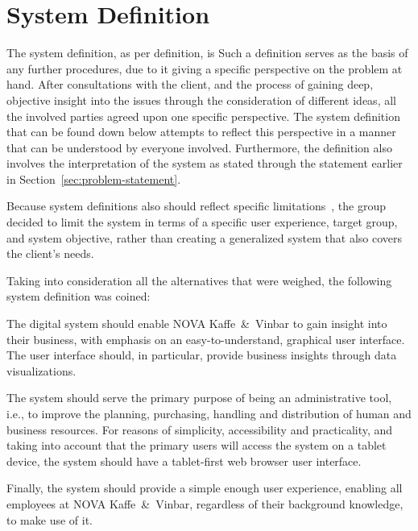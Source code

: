 \section{System Definition}\label{sec:system-definition}

The system definition, as per definition, is
Such a definition serves as the basis of any further procedures, due to it giving a specific perspective on the problem
at hand.
After consultations with the client, and the process of gaining deep, objective insight into the issues through the
consideration of different ideas, all the involved parties agreed upon one specific perspective.
The system definition that can be found down below attempts to reflect this perspective in a manner that can be
understood by everyone involved.
Furthermore, the definition also involves the interpretation of the system as stated through the statement earlier in
Section~\ref{sec:problem-statement}.

Because system definitions also should reflect specific limitations~\cite[38]{mathiassen2018}, the group decided to
limit the system in terms of a specific user experience, target group, and system objective, rather than creating a
generalized system that also covers the client's needs.

Taking into consideration all the alternatives that were weighed, the following system definition was coined:
\begin{tcolorbox}[title=System definition]
    The digital system should enable NOVA Kaffe~\&~Vinbar to gain insight into their business, with emphasis on an
    easy-to-understand, graphical user interface.
    The user interface should, in particular, provide business insights through data visualizations.

    The system should serve the primary purpose of being an administrative tool, i.e., to improve the planning,
    purchasing, handling and distribution of human and business resources.
    For reasons of simplicity, accessibility and practicality, and taking into account that the primary users will
    access the system on a tablet device, the system should have a tablet-first web browser user interface.

    Finally, the system should provide a simple enough user experience, enabling all employees at NOVA Kaffe~\&~Vinbar,
    regardless of their background knowledge, to make use of it.
\end{tcolorbox}
